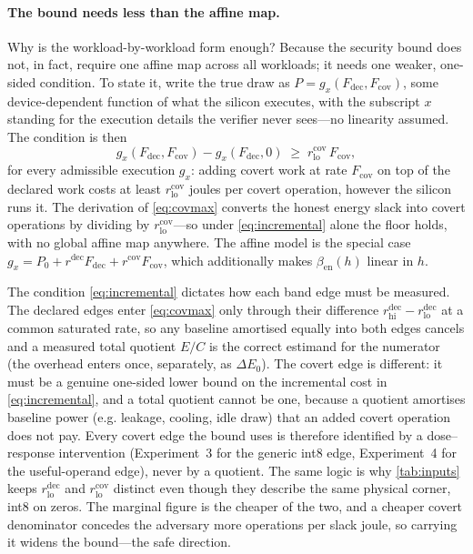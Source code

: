 \documentclass{article}
\theoremstyle{plain}
\theoremstyle{definition}
\theoremstyle{remark}
\begin{document}
\paragraph{The bound needs less than the affine map.}
\label{app:estimands}
Why is the workload-by-workload form enough? Because the security bound does
not, in fact, require one affine map across all workloads; it needs one
weaker, one-sided condition. To state it, write the true draw as
$P = g_x(F_{\mathrm{dec}}, F_{\mathrm{cov}})$, some device-dependent function
of what the silicon executes, with the subscript $x$ standing for the
execution details the verifier never sees---no linearity assumed. The
condition is then
\begin{equation}
	g_x(F_{\mathrm{dec}}, F_{\mathrm{cov}}) - g_x(F_{\mathrm{dec}}, 0)
	\;\ge\; r_{\mathrm{lo}}^{\mathrm{cov}}\,F_{\mathrm{cov}},
	\label{eq:incremental}
\end{equation}
for every admissible execution $g_x$: adding covert work at rate
$F_{\mathrm{cov}}$ on top of the declared work costs at least
$r_{\mathrm{lo}}^{\mathrm{cov}}$ joules per covert operation, however the
silicon runs it. The derivation
of \cref{eq:covmax} converts the honest energy slack into covert operations by
dividing by $r_{\mathrm{lo}}^{\mathrm{cov}}$---so under \cref{eq:incremental}
alone the floor holds, with no global affine map anywhere. The affine model is
the special case
$g_x = P_0 + r^{\mathrm{dec}}F_{\mathrm{dec}} + r^{\mathrm{cov}}F_{\mathrm{cov}}$,
which additionally makes $\beta_{\mathrm{en}}(h)$ linear in $h$.

The condition \cref{eq:incremental} dictates how each band edge must be measured. The declared edges
enter \cref{eq:covmax} only through their difference
$r_{\mathrm{hi}}^{\mathrm{dec}} - r_{\mathrm{lo}}^{\mathrm{dec}}$ at a common
saturated rate, so any baseline amortised equally into both edges cancels and
a measured total quotient $E/C$ is the correct estimand for the numerator (the
overhead enters once, separately, as $\Delta E_0$). The covert edge is
different: it must be a genuine one-sided lower bound on the incremental cost
in \cref{eq:incremental}, and a total quotient cannot be one, because a
quotient amortises baseline power (e.g. leakage, cooling, idle draw) that an
added covert operation does not pay. Every covert edge the bound uses is
therefore identified by a dose--response intervention (Experiment~3 for the
generic int8 edge, Experiment~4 for the useful-operand edge), never by a
quotient. The same logic is why \cref{tab:inputs} keeps
$r_{\mathrm{lo}}^{\mathrm{dec}}$ and $r_{\mathrm{lo}}^{\mathrm{cov}}$ distinct
even though they describe the same physical corner, int8 on zeros. The marginal figure is the
cheaper of the two, and a cheaper covert denominator concedes the adversary
more operations per slack joule, so carrying it widens the bound---the safe
direction.
\end{document}
